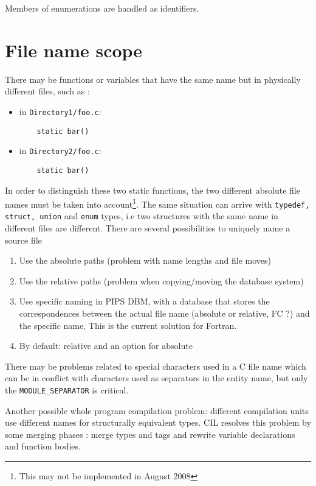 \documentclass[a4paper]{report}
\begin{document}
Members of enumerations are handled as identifiers.

\section{File name scope}

There may be functions or variables that have the same name but in physically
  different files, such as :

\begin{itemize}
\item in \texttt{Directory1/foo.c}:
  \begin{lstlisting}
    static bar()
  \end{lstlisting}
\item in \texttt{Directory2/foo.c}:
  \begin{lstlisting}
    static bar()
  \end{lstlisting}
\end{itemize}

In order to distinguish these two static functions, the two different
absolute file names must be taken into account\footnote{This may not
  be implemented in August 2008}. The same situation can arrive with
\verb/typedef, struct, union/ and \verb/enum/ types, i.e two
structures with the same name in different files are different.  There
are several possibilities to uniquely name a source file
\begin{enumerate}
\item Use the absolute paths (problem with name lengths and file moves)
\item Use the relative paths (problem when copying/moving the
  database system)
\item Use specific naming in PIPS DBM, with a database that stores the
  correspondences between the actual file name (absolute or relative, FC
  ?) and the specific name. This is the current solution for Fortran.
\item By default: relative and an option for absolute 
\end{enumerate}
There may be problems related to special characters used in a C file
name which can be in conflict with characters used as separators in
the entity name, but only the \verb/MODULE_SEPARATOR/ is critical.

Another possible whole program compilation problem: different
compilation units use different names for structurally equivalent
types. CIL \cite{Necu02} resolves this problem by some merging phases
: merge types and tags and rewrite variable declarations and function
bodies.
\end{document}
